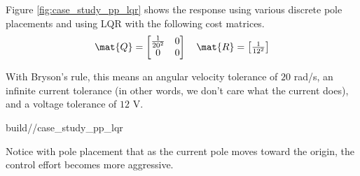 Figure \ref{fig:case_study_pp_lqr} shows the response using various discrete
pole placements and using LQR with the following cost matrices.
\begin{align*}
  \mat{Q} = \begin{bmatrix}
    \frac{1}{20^2} & 0 \\
    0 & 0
  \end{bmatrix}
  \quad
  \mat{R} = \begin{bmatrix}
    \frac{1}{12^2}
  \end{bmatrix}
\end{align*}

With Bryson's rule, this means an angular velocity tolerance of $20$ rad/s, an
infinite current tolerance (in other words, we don't care what the current
does), and a voltage tolerance of $12$ V.
\begin{svg}{build/\chapterpath/case_study_pp_lqr}
  \caption{Second-order CIM motor response with pole placement and LQR}
  \label{fig:case_study_pp_lqr}
\end{svg}

Notice with pole placement that as the current pole moves toward the origin, the
\gls{control effort} becomes more aggressive.

